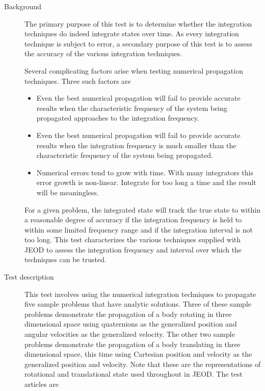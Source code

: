 \label{test:integ}
\begin{description}
\item[Background] The primary purpose of this test 
is to determine whether the \ModelDesc integration techniques
do indeed integrate states over time.
As every integration technique is subject to error, a secondary purpose of
this test is to assess the accuracy of the various integration techniques.

Several complicating factors arise when testing numerical propagation
techniques. Three such factors are
\begin{itemize}\vspace{-0.5\baselineskip}
\item Even the best numerical propagation will fail to provide accurate 
results when the characteristic frequency of the system being propagated 
approaches to the integration frequency.
\item Even the best numerical propagation will fail to provide accurate 
results when the integration frequency is much smaller than the 
characteristic frequency of the system being propagated.
\item Numerical errors tend to grow with time. With many integrators
this error growth is non-linear. Integrate for too long a time and the
result will be meaningless.
\end{itemize}
For a given problem, the integrated state will track the true state
to within a reasonable degree of accuracy
if the integration frequency is held to within some limited frequency range
and if the integration interval is not too long. This test characterizes
the various techniques supplied with JEOD to assess the integration
frequency and interval over which the techniques can be trusted.

\item[Test description] 
This test involves using the numerical integration techniques to propagate
five sample problems that have analytic solutions.
Three of these sample problems demonstrate the propagation of a body
rotating in three dimensional space
using quaternions as the generalized position
and angular velocities as the generalized velocity.
The other two sample problems demonstrate the propagation of a body
translating in three dimensional space, this time using Cartesian
position and velocity as the generalized position and velocity.
Note that these are the representations of rotational and translational state
used throughout in JEOD. The test articles are


\end{description}
